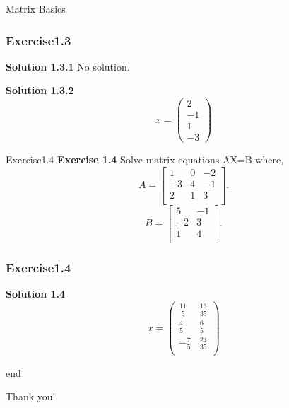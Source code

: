 \documentclass{beamer}
\begin{document}
\begin{section}{Matrix Basics}
\begin{frame}
    \frametitle{Exercise1.3}
    \textbf{Solution 1.3.1} No solution.
    \par 
    \textbf{Solution 1.3.2}
    \begin{equation*}
        x=\left(
    \begin{array}{c}
         2  \\
         -1 \\
         1 \\
         -3
    \end{array}
        \right)
    \end{equation*}
    
\end{frame}

\begin{frame}{Exercise1.4}
    \textbf{Exercise 1.4} 
    Solve matrix equations AX=B where,
            \begin{equation*}
                A = \left[ \begin{array}{ccc} 
                    1 & 0 & -2 \\
                    -3& 4 & -1\\
                    2&1&3\\
                \end{array} \right].
            \end{equation*}
            \begin{equation*}
                B = \left[ \begin{array}{cc} 
                    5 & -1 \\
                    -2&3 \\ 
                    1&4\\
        \end{array} \right].
    \end{equation*}
\end{frame}

\begin{frame}
    \frametitle{Exercise1.4}
    \textbf{Solution 1.4} 
        \begin{equation*}
            x=\left(
            \begin{array}{cc}
                \frac{11}{5} & \frac{13}{35}  \\[6pt]
                \frac{4}{5}  & \frac{6}{5} \\[6pt]
                -\frac{7}{5} & \frac{24}{35} \\
            \end{array}
            \right)
        \end{equation*}    
    
\end{frame}

\begin{frame}{\textcolor{green!30!black}{end}}
    \begin{center}
        \LARGE Thank you!
    \end{center}
\end{frame}


\end{section}
\end{document}
